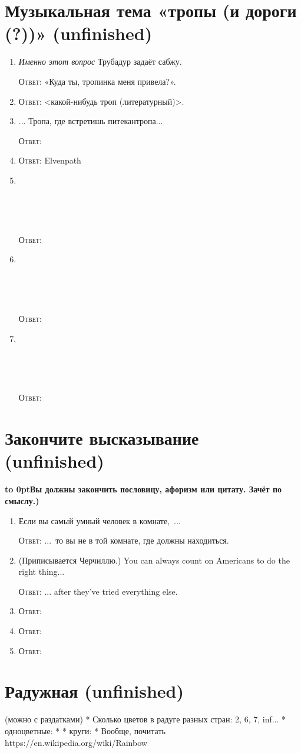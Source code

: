 \documentclass[a4paper,10pt]{article}
\let\keyword\textsc
\newenvironment{topic}{\begin{enumerate}}{\end{enumerate}}
\newcommand{\question}[3]{\item[#1.] #2 \par \keyword{Ответ:} #3}
\newcommand{\topiccommentary}[1]{\begin{adjustwidth}{0.9cm}{} \vspace{-0.3em}\textbf{\hbox to 0pt{\hss{(}}#1)} \end{adjustwidth}}
\newcommand{\placeholder}{~\par~\par~}
\begin{document}
\section{Музыкальная тема «тропы (и дороги (?))» (unfinished)}

\begin{topic}
 \question{10}{\emph{Именно этот вопрос} Трубадур задаёт сабжу.}{«Куда ты, тропинка меня привела?».}
 \question{30--40}{}{<какой-нибудь троп (литературный)>.}
 \question{??}{... Тропа, где встретишь питекантропа...}{}
 \question{??}{}{Elvenpath}
 \question{??}{\placeholder}{}
 \question{??}{\placeholder}{}
 \question{??}{\placeholder}{}
\end{topic}


\section{Закончите высказывание (unfinished)}
\topiccommentary{Вы должны закончить пословицу, афоризм или цитату. Зачёт по смыслу.}

\begin{topic}
 \question{??}{Если вы самый умный человек в комнате,~...}{...~то вы не в той комнате, где должны находиться.}
 \question{??}{(Приписывается Черчиллю.) You can always count on Americans to do the right thing...}{... after they’ve tried everything else.}
 \question{??}{}{}
 \question{??}{}{}
 \question{??}{}{}
\end{topic}


\section{Радужная (unfinished)}
(можно с раздатками)
* Сколько цветов в радуге разных стран: 2, 6, 7, inf...
* одноцветные:
*
* круги:
*
Вообще, почитать https://en.wikipedia.org/wiki/Rainbow
\end{document}
